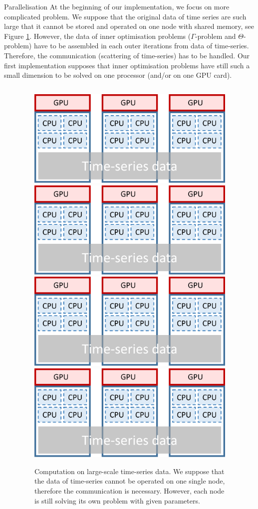 \documentclass[final,hyperref={pdfpagelabels=false}]{beamer}
\begin{document}
\begin{frame}[t]
\begin{columns}[t]
\begin{column}{.48\textwidth}
\begin{block}{Parallelisation}
At the beginning of our implementation, we focus on more complicated problem. We suppose that the original data of time series are such large that it cannot be stored
and operated on one node with shared memory, see Figure \ref{fig:parallelisation}. 
However, the data of inner optimisation problems ($\Gamma$-problem and $\Theta$-problem) have to be assembled in each outer iterations from data of time-series.
Therefore, the communication (scattering of time-series) has to be handled.
Our first implementation supposes that inner optimisation problems have still such a small dimension to be solved on one processor (and/or on one GPU card).

\begin{columns}[T]
\begin{column}{0.02\linewidth}\end{column}
\begin{column}{0.94\linewidth}
	\begin{figure}[H]
		\begin{center}
			\includegraphics[width=0.22\linewidth, angle=0, clip = true]{figures/computing_node.png}
			\hfil
			\includegraphics[width=0.22\linewidth, angle=0, clip = true]{figures/computing_node.png}
			\hfil
			\includegraphics[width=0.22\linewidth, angle=0, clip = true]{figures/computing_node.png}
			\hfil
			\includegraphics[width=0.22\linewidth, angle=0, clip = true]{figures/computing_node.png}
			\caption{Computation on large-scale time-series data. We suppose that the data of time-series cannot be operated on one single node, therefore the communication is necessary.
					 However, each node is still solving its own problem with given parameters.
					 }
			\label{fig:parallelisation}		 
		\end{center}
	\end{figure}
\end{column}	
\begin{column}{0.02\linewidth}\end{column}
\end{columns}


\end{block}
\end{column}
\end{columns}
\end{frame}
\end{document}
